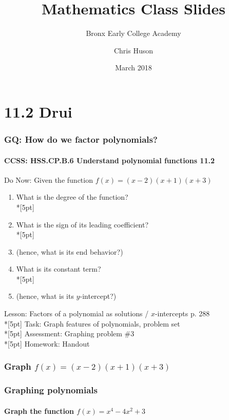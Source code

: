 \documentclass{beamer}
\title{Mathematics Class Slides}
\subtitle{Bronx Early College Academy}
\author{Chris Huson}
\date{March 2018}
\begin{document}
\frame{\titlepage}


\section{11.2 Drui}
\frame
{
  \frametitle{GQ: How do we factor polynomials?}
  \framesubtitle{CCSS: HSS.CP.B.6 Understand polynomial functions \qquad \qquad \qquad \alert{11.2}}

  \begin{block}{Do Now: Given the function $f(x)=(x-2)(x+1)(x+3)$}
    \begin{enumerate}
    \item What is the degree of the function?\\*[5pt]
    \item What is the sign of its leading coefficient?\\*[5pt]
    \item (hence, what is its end behavior?)
    \item What is its constant term?\\*[5pt]
    \item (hence, what is its $y$-intercept?)
    \end{enumerate}
  \end{block}
  Lesson: Factors of a polynomial as solutions / $x$-intercepts p. 288\\*[5pt]
  Task: Graph features of polynomials, problem set\\*[5pt]
  Assessment: Graphing problem \#3\\*[5pt]
  Homework: Handout 
}

\frame
{
  \frametitle{Graph $f(x)=(x-2)(x+1)(x+3)$}
  
}

\frame
{
  \frametitle{Graphing polynomials}
  \framesubtitle{Graph the function $f(x)=x^4-4x^2+3$}
  
}
\end{document}
